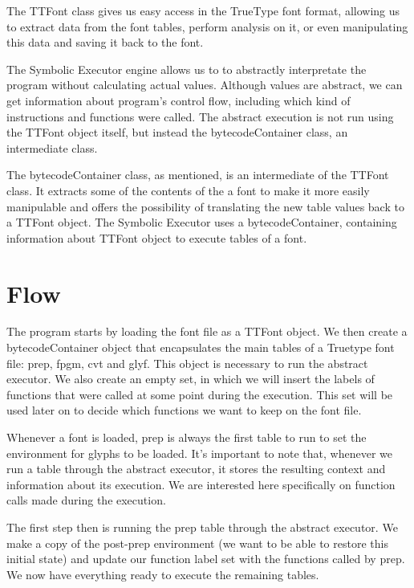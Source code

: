 \documentclass[12pt]{article}
\begin{document}
The TTFont class gives us easy access in the TrueType font format,
allowing us to extract data from the font tables, perform analysis on
it, or even manipulating this data and saving it back to the font. 

The Symbolic Executor engine allows us to to abstractly
interpretate the program without calculating actual values. Although
values are abstract,  we can get information about program's control
flow, including which kind of instructions and functions were called.
The abstract execution is not run using the TTFont object itself, but
instead the bytecodeContainer class, an intermediate class.

The bytecodeContainer class, as mentioned, is an intermediate of
the TTFont class. It extracts some of the contents of the a font to make
it more easily manipulable and offers the possibility of translating the
new table values back to a TTFont object. The Symbolic Executor uses a
bytecodeContainer, containing information about TTFont object to execute
tables of a font.

\section{Flow}

The program starts by loading the font file as a TTFont object.
We then create a bytecodeContainer object that encapsulates the main
tables of a Truetype font file: prep, fpgm, cvt and glyf. This object 
is necessary to run the abstract executor. We also create an empty set, 
in which we will insert the labels of functions that were called at some 
point during the execution. This set will be used later on to decide 
which functions we want to keep on the font file.

Whenever a font is loaded, prep is always the first table to run to 
set the environment for glyphs to be loaded. It's important to note that, 
whenever we run a table through the abstract executor, it stores the
resulting context and information about its execution. We are interested 
here specifically on function calls made during the execution.

The first step then is running the prep table through the abstract 
executor. We make a copy of the post-prep environment (we want to be
able to restore this initial state) and update our function label
set with the functions called by prep. We now have everything ready to
execute the remaining tables.
\end{document}
